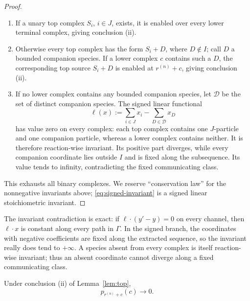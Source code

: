 \begin{proof}
\begin{enumerate}[label=\textup{(\alph*)},leftmargin=2.5em]
\item If a unary top complex \(S_i\), \(i\in J\), exists, it is enabled over
      every lower terminal complex, giving conclusion (ii).
\item Otherwise every top complex has the form \(S_i+D\), where
      \(D\notin I\); call \(D\) a bounded companion species.  If a lower complex
      \(c\) contains such a \(D\), the corresponding top source \(S_i+D\)
      is enabled at \(r^{(n)}+c\), giving conclusion (ii).
\item If no lower complex contains any bounded companion species, let
      \(\mathcal D\) be the set of distinct companion species.  The signed
      linear functional
      \begin{equation}\label{eq:signed-invariant}
        \ell(x):=\sum_{i\in J}x_i-\sum_{D\in\mathcal D}x_D
      \end{equation}
      has value zero on every complex: each top complex contains one
      \(J\)-particle and one companion particle, whereas a lower complex
      contains neither.  It is therefore reaction-wise invariant.  Its
      positive part diverges, while every companion coordinate lies outside
      \(I\) and is fixed along the subsequence.  Its value tends to infinity,
      contradicting the fixed communicating class.
\end{enumerate}

This exhausts all binary complexes.  We reserve ``conservation law'' for the
nonnegative invariants above; \eqref{eq:signed-invariant} is a signed linear
stoichiometric invariant.
\end{proof}

The invariant contradiction is exact: if \(\ell\cdot(y'-y)=0\) on every
channel, then \(\ell\cdot x\) is constant along every path in \(\Gamma\).
In the signed branch, the coordinates with negative coefficients are fixed along
the extracted sequence, so the invariant really does tend to \(+\infty\).
A species absent from every complex is itself reaction-wise invariant; thus an
absent coordinate cannot diverge along a fixed communicating class.

\begin{lemma}\label{lem:terminal}
Under conclusion \textup{(ii)} of Lemma~\ref{lem:top},
\begin{equation}\label{eq:terminal-zero}
  p_{r^{(n)}+c}(c)\longrightarrow0.
\end{equation}
\end{lemma}

